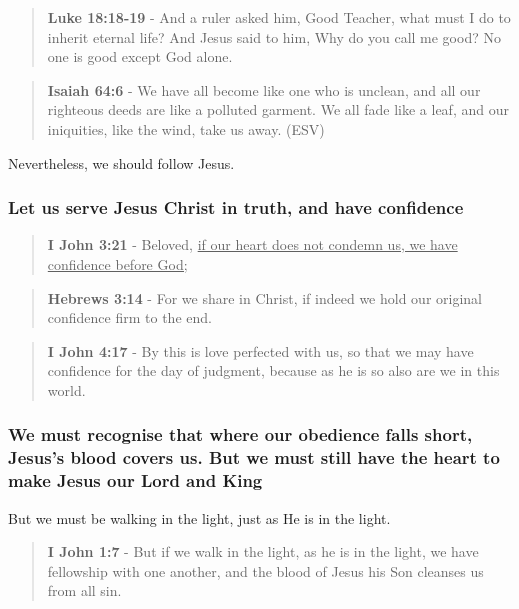 \documentclass[11pt]{article}
\begin{document}
\begin{quote}
\textbf{Luke 18:18-19} - And a ruler asked him, Good Teacher, what must I do to inherit eternal life? And Jesus said to him, Why do you call me good? No one is good except God alone.
\end{quote}

\begin{quote}
\textbf{Isaiah 64:6} - We have all become like one who is unclean, and all our righteous deeds are like a polluted garment. We all fade like a leaf, and our iniquities, like the wind, take us away. (ESV)
\end{quote}

Nevertheless, we should follow Jesus.

\subsubsection{Let us serve Jesus Christ in truth, and have confidence}
\label{sec:orgf674181}

\begin{quote}
\textbf{I John 3:21} - Beloved, \uline{if our heart does not condemn us, we have confidence before God;}
\end{quote}

\begin{quote}
\textbf{Hebrews 3:14} - For we share in Christ, if indeed we hold our original confidence firm to the end.
\end{quote}

\begin{quote}
\textbf{I John 4:17} - By this is love perfected with us, so that we may have confidence for the day of judgment, because as he is so also are we in this world.
\end{quote}

\subsubsection{We must recognise that where our obedience falls short, Jesus's blood covers us. But we must still have the heart to make Jesus our Lord and King}
\label{sec:org976c468}
But we must be walking in the light, just as He is in the light.

\begin{quote}
\textbf{I John 1:7} - But if we walk in the light, as he is in the light, we have fellowship with one another, and the blood of Jesus his Son cleanses us from all sin.
\end{quote}
\end{document}
